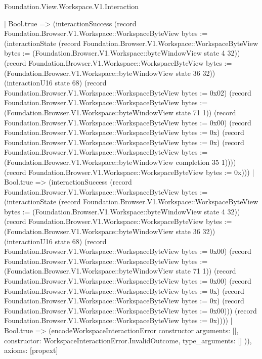 \begin{lexlean}{Foundation.View.Workspace.V1.Interaction}
\begin{semanticmodule}
{          | Bool.true => (interactionSuccess (record Foundation.Browser.V1.Workspace::WorkspaceByteView {bytes := (interactionState (record Foundation.Browser.V1.Workspace::WorkspaceByteView {bytes := (Foundation.Browser.V1.Workspace::byteWindowView state 4 32)}) (record Foundation.Browser.V1.Workspace::WorkspaceByteView {bytes := (Foundation.Browser.V1.Workspace::byteWindowView state 36 32)}) (interactionU16 state 68) (record Foundation.Browser.V1.Workspace::WorkspaceByteView {bytes := 0x02}) (record Foundation.Browser.V1.Workspace::WorkspaceByteView {bytes := (Foundation.Browser.V1.Workspace::byteWindowView state 71 1)}) (record Foundation.Browser.V1.Workspace::WorkspaceByteView {bytes := 0x00}) (record Foundation.Browser.V1.Workspace::WorkspaceByteView {bytes := 0x}) (record Foundation.Browser.V1.Workspace::WorkspaceByteView {bytes := 0x}) (record Foundation.Browser.V1.Workspace::WorkspaceByteView {bytes := (Foundation.Browser.V1.Workspace::byteWindowView completion 35 1)}))}) (record Foundation.Browser.V1.Workspace::WorkspaceByteView {bytes := 0x})))
        | Bool.true => (interactionSuccess (record Foundation.Browser.V1.Workspace::WorkspaceByteView {bytes := (interactionState (record Foundation.Browser.V1.Workspace::WorkspaceByteView {bytes := (Foundation.Browser.V1.Workspace::byteWindowView state 4 32)}) (record Foundation.Browser.V1.Workspace::WorkspaceByteView {bytes := (Foundation.Browser.V1.Workspace::byteWindowView state 36 32)}) (interactionU16 state 68) (record Foundation.Browser.V1.Workspace::WorkspaceByteView {bytes := 0x00}) (record Foundation.Browser.V1.Workspace::WorkspaceByteView {bytes := (Foundation.Browser.V1.Workspace::byteWindowView state 71 1)}) (record Foundation.Browser.V1.Workspace::WorkspaceByteView {bytes := 0x00}) (record Foundation.Browser.V1.Workspace::WorkspaceByteView {bytes := 0x}) (record Foundation.Browser.V1.Workspace::WorkspaceByteView {bytes := 0x}) (record Foundation.Browser.V1.Workspace::WorkspaceByteView {bytes := 0x00}))}) (record Foundation.Browser.V1.Workspace::WorkspaceByteView {bytes := 0x}))))
    | Bool.true => (encodeWorkspaceInteractionError constructor{
      arguments: [],
      constructor: WorkspaceInteractionError.InvalidOutcome,
      type_arguments: []
    })),
  axioms: [propext]
}


\end{semanticmodule}
\end{lexlean}
